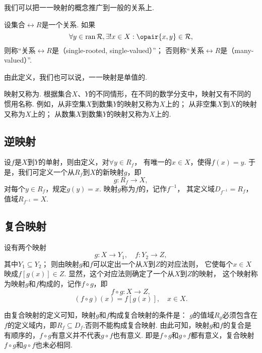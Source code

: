 我们可以把一一映射的概念推广到一般的关系上.
\begin{definition}
设集合\(\rel{R}\)是一个关系.
如果\[
	\forall y \in \ran \rel{R},
	\exists! x \in X:
	\opair{x,y} \in \rel{R},
\]
则称“关系\(\rel{R}\)是（single-rooted, single-valued）”；
否则称“关系\(\rel{R}\)是（many-valued）”.
\end{definition}

由此定义，我们也可以说，一一映射是单值的.

映射又称为.
根据集合\(X\)、\(Y\)的不同情形，在不同的数学分支中，映射又有不同的惯用名称.
例如，从非空集\(X\)到数集\(Y\)的映射又称为\(X\)上的；
从非空集\(X\)到\(X\)的映射又称为\(X\)上的；
从数集\(X\)到数集\(Y\)的映射又称为\(X\)上的.

\subsection{逆映射}
\begin{definition}
设\(f\)是\(X\)到\(Y\)的单射，则由定义，对\(\forall y \in R_f\)，
有唯一的\(x \in X\)，使得\(f(x) = y\).
于是，我们可定义一个从\(R_f\)到\(X\)的新映射\(g\)，即\[
	g: R_f \to X,
\]对每个\(y \in R_f\)，规定\(g(y) = x\).
映射\(g\)称为\(f\)的，记作\(f^{-1}\)，
其定义域\(D_{f^{-1}} = R_f\)，值域\(R_{f^{-1}} = X\).
\end{definition}

\subsection{复合映射}
\begin{definition}
设有两个映射\[
g\colon X \to Y_1, \quad f\colon Y_2 \to Z,
\]其中\(Y_1 \subseteq Y_2\)；
则由映射\(g\)和\(f\)可以定出一个从\(X\)到\(Z\)的对应法则，
它使每个\(x \in X\)映成\(f[g(x)] \in Z\).
显然，这个对应法则确定了一个从\(X\)到\(Z\)的映射，
这个映射称为映射\(g\)和\(f\)构成的，记作\(f \circ g\)，即\[
f \circ g: X \to Z,
\]\[
(f \circ g)(x) = f[g(x)], \quad x \in X.
\]

由复合映射的定义可知，映射\(g\)和\(f\)构成复合映射的条件是：
\(g\)的值域\(R_g\)必须包含在\(f\)的定义域内，即\(R_f \subseteq D_f\).否则不能构成复合映射.
由此可知，映射\(g\)和\(f\)的复合是有顺序的，\(f \circ g\)有意义并不代表\(g \circ f\)也有意义.
即是\(f \circ g\)和\(g \circ f\)都有意义，复合映射\(f \circ g\)和\(g \circ f\)也未必相同.
\end{definition}


